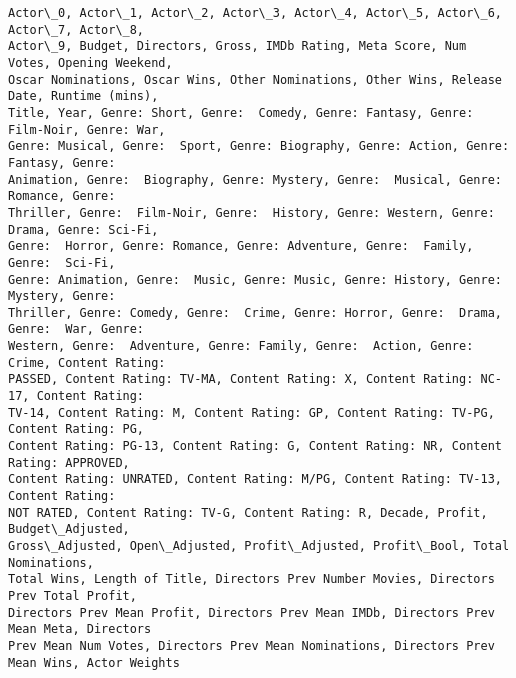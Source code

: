\documentclass{article}
\begin{document}
\begin{Verbatim}[commandchars=\\\{\}]
Actor\_0, Actor\_1, Actor\_2, Actor\_3, Actor\_4, Actor\_5, Actor\_6, Actor\_7, Actor\_8,
Actor\_9, Budget, Directors, Gross, IMDb Rating, Meta Score, Num Votes, Opening Weekend,
Oscar Nominations, Oscar Wins, Other Nominations, Other Wins, Release Date, Runtime (mins),
Title, Year, Genre: Short, Genre:  Comedy, Genre: Fantasy, Genre: Film-Noir, Genre: War,
Genre: Musical, Genre:  Sport, Genre: Biography, Genre: Action, Genre:  Fantasy, Genre:  
Animation, Genre:  Biography, Genre: Mystery, Genre:  Musical, Genre:  Romance, Genre: 
Thriller, Genre:  Film-Noir, Genre:  History, Genre: Western, Genre: Drama, Genre: Sci-Fi,
Genre:  Horror, Genre: Romance, Genre: Adventure, Genre:  Family, Genre:  Sci-Fi,
Genre: Animation, Genre:  Music, Genre: Music, Genre: History, Genre:  Mystery, Genre: 
Thriller, Genre: Comedy, Genre:  Crime, Genre: Horror, Genre:  Drama, Genre:  War, Genre: 
Western, Genre:  Adventure, Genre: Family, Genre:  Action, Genre: Crime, Content Rating:
PASSED, Content Rating: TV-MA, Content Rating: X, Content Rating: NC-17, Content Rating:
TV-14, Content Rating: M, Content Rating: GP, Content Rating: TV-PG, Content Rating: PG,
Content Rating: PG-13, Content Rating: G, Content Rating: NR, Content Rating: APPROVED,
Content Rating: UNRATED, Content Rating: M/PG, Content Rating: TV-13, Content Rating: 
NOT RATED, Content Rating: TV-G, Content Rating: R, Decade, Profit, Budget\_Adjusted,
Gross\_Adjusted, Open\_Adjusted, Profit\_Adjusted, Profit\_Bool, Total Nominations,
Total Wins, Length of Title, Directors Prev Number Movies, Directors Prev Total Profit,
Directors Prev Mean Profit, Directors Prev Mean IMDb, Directors Prev Mean Meta, Directors 
Prev Mean Num Votes, Directors Prev Mean Nominations, Directors Prev Mean Wins, Actor Weights
\end{Verbatim}
\end{document}
